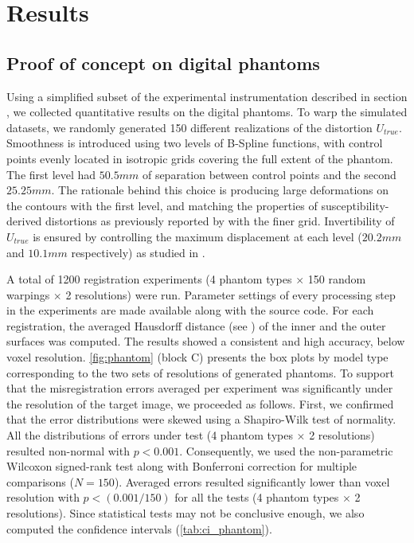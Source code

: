 \section{Results}
\label{sec:results}

\subsection{Proof of concept on digital phantoms}
\label{sec:results_phantom}
Using a simplified subset of the experimental instrumentation described in section
  , we collected quantitative results on the digital
  phantoms.
To warp the simulated datasets, we randomly generated 150 different realizations of
  the distortion $U_{true}$.
Smoothness is introduced using two levels of B-Spline functions, with control points evenly
  located in isotropic grids covering the full extent of the phantom.
The first level had $50.5mm$ of separation between control points and the second $25.25mm$.
The rationale behind this choice is producing large deformations on the contours with
  the first level, and matching the properties of susceptibility-derived distortions
  as previously reported by \cite{irfanoglu_susceptibility_2011} with the finer grid.
Invertibility of $U_{true}$ is ensured by controlling the maximum displacement at each
  level ($20.2mm$ and $10.1mm$ respectively) as studied in \citep{rueckert_diffeomorphic_2006}.

A total of 1200 registration experiments (4 phantom types $\times$ 150 random warpings
  $\times$ 2 resolutions) were run.
Parameter settings of every processing step in the experiments are made available along with
  the source code.
For each registration, the averaged Hausdorff distance (see )
  of the inner and the outer surfaces was computed.
The results showed a consistent and high accuracy, below voxel resolution.
\autoref{fig:phantom} (block C) presents the box plots by model type corresponding
  to the two sets of resolutions of generated phantoms.
To support that the misregistration errors averaged per experiment was significantly
  under the resolution of the target image, we proceeded as follows.
First, we confirmed that the error distributions were skewed using a Shapiro-Wilk test of
  normality.
All the distributions of errors under test (4 phantom types $\times$ 2 resolutions) resulted
  non-normal with $p<0.001$.
Consequently, we used the non-parametric Wilcoxon signed-rank test along with Bonferroni
  correction for multiple comparisons ($N=150$).
Averaged errors resulted significantly lower than voxel resolution with $p < (0.001 / 150)$
  for all the tests (4 phantom types $\times$ 2 resolutions).
Since statistical tests may not be conclusive enough, we also computed the confidence intervals
  (\autoref{tab:ci_phantom}).


